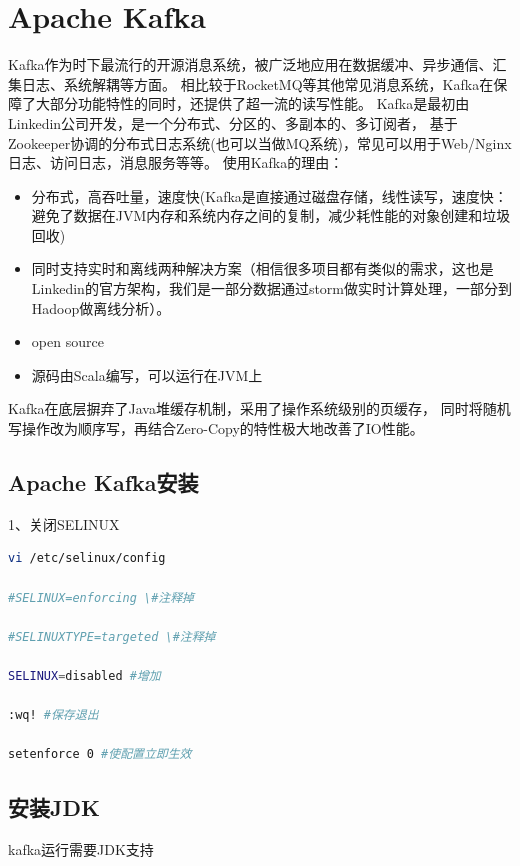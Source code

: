 \documentclass{book}
\begin{document}
\section{Apache Kafka}

Kafka作为时下最流行的开源消息系统，被广泛地应用在数据缓冲、异步通信、汇集日志、系统解耦等方面。
相比较于RocketMQ等其他常见消息系统，Kafka在保障了大部分功能特性的同时，还提供了超一流的读写性能。
Kafka是最初由Linkedin公司开发，是一个分布式、分区的、多副本的、多订阅者，
基于Zookeeper协调的分布式日志系统(也可以当做MQ系统)，常见可以用于Web/Nginx日志、访问日志，消息服务等等。
使用Kafka的理由：

\begin{itemize}
	\item{分布式，高吞吐量，速度快(Kafka是直接通过磁盘存储，线性读写，速度快：避免了数据在JVM内存和系统内存之间的复制，减少耗性能的对象创建和垃圾回收)}
	\item{同时支持实时和离线两种解决方案（相信很多项目都有类似的需求，这也是Linkedin的官方架构，我们是一部分数据通过storm做实时计算处理，一部分到Hadoop做离线分析）。}
	\item{open source}
	\item{源码由Scala编写，可以运行在JVM上}
\end{itemize}

Kafka在底层摒弃了Java堆缓存机制，采用了操作系统级别的页缓存，
同时将随机写操作改为顺序写，再结合Zero-Copy的特性极大地改善了IO性能。

\subsection{Apache Kafka安装}

1、关闭SELINUX

\begin{lstlisting}[language=Bash]
vi /etc/selinux/config

#SELINUX=enforcing \#注释掉

#SELINUXTYPE=targeted \#注释掉

SELINUX=disabled #增加

:wq! #保存退出

setenforce 0 #使配置立即生效
\end{lstlisting}

\subsection{安装JDK}

kafka运行需要JDK支持
\end{document}
